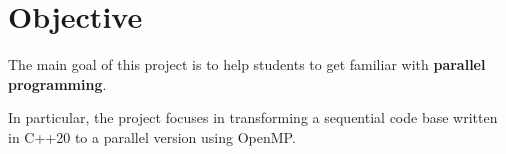 \section{Objective}

The main goal of this project is to help students to get familiar
with \textbf{parallel programming}.

In particular, the project focuses in transforming a sequential code base
written in C++20 to a parallel version using OpenMP.
